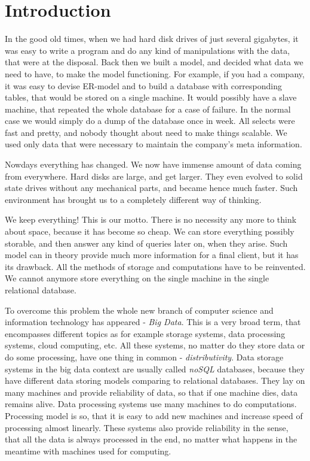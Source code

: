 \chapter{Introduction}
\label{chap:introduction}

In the good old times, when we had hard disk drives of just several gigabytes, it was easy to write a program and do any kind of manipulations with the data, that were at the disposal.
Back then we built a model, and decided what data we need to have, to make the model functioning.
For example, if you had a company, it was easy to devise ER-model and to build a database with corresponding tables, that would be stored on a single machine.
It would possibly have a slave machine, that repeated the whole database for a case of failure.
In the normal case we would simply do a dump of the database once in week.
All selects were fast and pretty, and nobody thought about need to make things scalable.
We used only data that were necessary to maintain the company's meta information.

Nowdays everything has changed.
We now have immense amount of data coming from everywhere.
Hard disks are large, and get larger.
They even evolved to solid state drives without any mechanical parts, and became hence much faster.
Such environment has brought us to a completely different way of thinking.

We keep everything!
This is our motto.
There is no necessity any more to think about space, because it has become so cheap.
We can store everything possibly storable, and then answer any kind of queries later on, when they arise.
Such model can in theory provide much more information for a final client, but it has its drawback.
All the methods of storage and computations have to be reinvented.
We cannot anymore store everything on the single machine in the single relational database.

To overcome this problem the whole new branch of computer science and information technology has appeared - \textit{Big Data}.
This is a very broad term, that encompasses different topics as for example storage systems, data processing systems, cloud computing, etc.
All these systems, no matter do they store data or do some processing, have one thing in common - \textit{distributivity}.
Data storage systems in the big data context are usually called \textit{noSQL} databases, because they have different data storing models comparing to relational databases.
They lay on many machines and provide reliability of data, so that if one machine dies, data remains alive.
Data processing systems use many machines to do computations.
Processing model is so, that it is easy to add new machines and increase speed of processing almost linearly.
These systems also provide reliability in the sense, that all the data is always processed in the end, no matter what happens in the meantime with machines used for computing.

